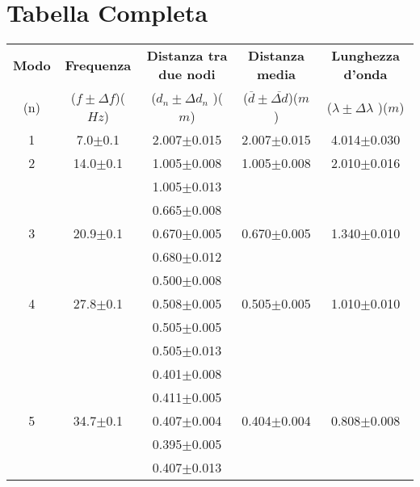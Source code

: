 \documentclass[12pt, a4paper]{article}
\begin{document}
\section{Tabella Completa}
{
\renewcommand\arraystretch{1.08} %
\begin{table}[h!] %
    \centering
    \begin{tabular}{|c|c|c|c|c|} %
    
    \hline %
    \textbf{Modo} & \textbf{Frequenza} & \textbf{Distanza tra due nodi} & \textbf{Distanza media} & \textbf{Lunghezza d'onda} \\ (n) & ($f\pm\Delta f$)($Hz$) & ($d_n\pm\Delta d_n$ )($m$) & ($\overline{d}\pm\overline{\Delta{d}}$)($m$) & ($\lambda\pm\Delta\lambda$ )($m$) \\ [1ex] 
    
    \hline\hline %
1 & 7.0$\pm$0.1  & 2.007$\pm$0.015 & 2.007$\pm$0.015 & 4.014$\pm$0.030 \\ [0.7ex] %
    
    \hline %
2 & 14.0$\pm$0.1 & 1.005$\pm$0.008 & 1.005$\pm$0.008 & 2.010$\pm$0.016 \\ [0.7ex]
       &              & 1.005$\pm$0.013 &                 &            \\ [0.7ex]
    
    \hline
       &              & 0.665$\pm$0.008 &                 &            \\ [0.7ex]
3 & 20.9$\pm$0.1 & 0.670$\pm$0.005 & 0.670$\pm$0.005 & 1.340$\pm$0.010 \\ [0.7ex]
       &              & 0.680$\pm$0.012 &                 &            \\ [0.7ex]
    
    \hline 
       &              & 0.500$\pm$0.008 &                 &            \\ [0.7ex]
4 & 27.8$\pm$0.1 & 0.508$\pm$0.005 & 0.505$\pm$0.005 & 1.010$\pm$0.010 \\ [0.7ex]
       &              & 0.505$\pm$0.005 &                 &            \\ [0.7ex]
       &              & 0.505$\pm$0.013 &                 &            \\ [0.7ex]
   
    \hline %
       &              & 0.401$\pm$0.008 &                 &            \\ [0.7ex]
       &              & 0.411$\pm$0.005 &                 &            \\ [0.7ex]
5 & 34.7$\pm$0.1 & 0.407$\pm$0.004 & 0.404$\pm$0.004 & 0.808$\pm$0.008 \\ [0.7ex]
       &              & 0.395$\pm$0.005 &                 &            \\ [0.7ex]
       &              & 0.407$\pm$0.013 &                 &            \\ [0.7ex]
     

\end{tabular}
\end{table}}
\end{document}

